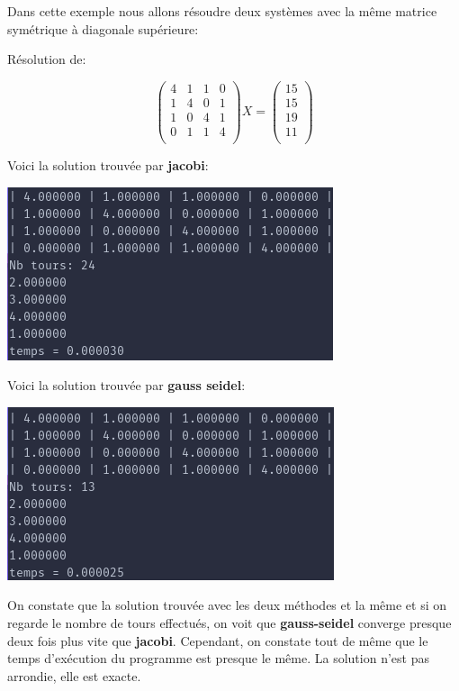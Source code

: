 \documentclass[a4paper]{article}
\begin{document}
Dans cette exemple nous allons résoudre deux systèmes avec la même matrice
symétrique à diagonale supérieure:

Résolution de:

\[
\begin{pmatrix}
  4 & 1 & 1 & 0\\
  1 & 4 & 0 & 1\\
  1 & 0 & 4 & 1\\
  0 & 1 & 1 & 4\\
\end{pmatrix} X =
\begin{pmatrix}
  15\\
  15\\
  19\\
  11\\
\end{pmatrix}
\]

Voici la solution trouvée par \textbf{jacobi}:

\includegraphics[scale=0.5]{./img/jacobi/jac_ex_1.png}

Voici la solution trouvée par \textbf{gauss seidel}:

\includegraphics[scale=0.5]{./img/gauss_seidel/g_e_ex_1.png}

On constate que la solution trouvée avec les deux méthodes et la même et si on
regarde le nombre de tours effectués, on voit que \textbf{gauss-seidel} converge
presque deux fois plus vite que \textbf{jacobi}. Cependant, on constate tout de
même que le temps d’exécution du programme est presque le même. La solution
n'est pas arrondie, elle est exacte.
\end{document}
